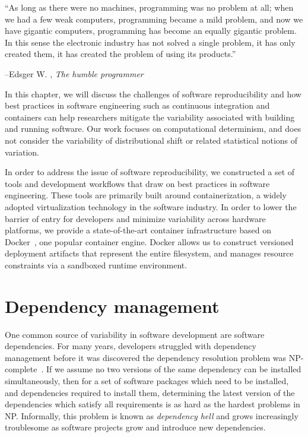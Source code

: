 \documentclass[12pt,initial,twoside,maitrise]{dms}
\numberwithin{equation}{section}
\numberwithin{table}{chapter}
\numberwithin{figure}{chapter}
\begin{document}
\setlength{\epigraphwidth}{0.80\textwidth}
\epigraph{``As long as there were no machines, programming was no problem at all; when we had a few weak computers, programming became a mild problem, and now we have gigantic computers, programming has become an equally gigantic problem. In this sense the electronic industry has not solved a single problem, it has only created them, it has created the problem of using its products.''}{\begin{flushright}--Edsger W. \citet{dijkstra1972humble}, \textit{The humble programmer}\end{flushright}}

In this chapter, we will discuss the challenges of software reproducibility and how best practices in software engineering such as continuous integration and containers can help researchers mitigate the variability associated with building and running software. Our work focuses on computational determinism, and does not consider the variability of distributional shift or related statistical notions of variation.

In order to address the issue of software reproducibility, we constructed a set of tools and development workflows that draw on best practices in software engineering. These tools are primarily built around containerization, a widely adopted virtualization technology in the software industry. In order to lower the barrier of entry for developers and minimize variability across hardware platforms, we provide a state-of-the-art container infrastructure based on Docker~\citep{merkel2014docker}, one popular container engine. Docker allows us to construct versioned deployment artifacts that represent the entire filesystem, and manages resource constraints via a sandboxed runtime environment.

\section{Dependency management}\label{sec:dependency-management}

One common source of variability in software development are software dependencies. For many years, developers struggled with dependency management before it was discovered the dependency resolution problem was NP-complete~\citep{abate2012dependency}. If we assume no two versions of the same dependency can be installed simultaneously, then for a set of software packages which need to be installed, and dependencies required to install them, determining the latest version of the dependencies which satisfy all requirements is as hard as the hardest problems in NP. Informally, this problem is known as \textit{dependency hell} and grows increasingly troublesome as software projects grow and introduce new dependencies.
\end{document}
